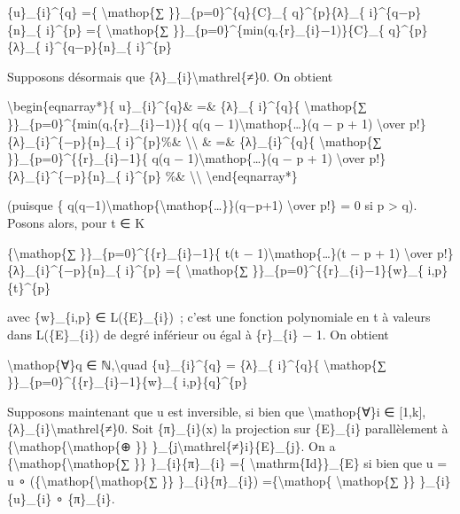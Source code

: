\documentclass[]{article}
\begin{document}
\{u\}\_\{i\}\^{}\{q\} =\{ \textbackslash{}mathop\{∑
\}\}\_\{p=0\}\^{}\{q\}\{C\}\_\{ q\}\^{}\{p\}\{λ\}\_\{
i\}\^{}\{q−p\}\{n\}\_\{ i\}\^{}\{p\} =\{ \textbackslash{}mathop\{∑
\}\}\_\{p=0\}\^{}\{min(q,\{r\}\_\{i\}−1)\}\{C\}\_\{
q\}\^{}\{p\}\{λ\}\_\{ i\}\^{}\{q−p\}\{n\}\_\{ i\}\^{}\{p\}

Supposons désormais que \{λ\}\_\{i\}\textbackslash{}mathrel\{≠\}0. On
obtient

\textbackslash{}begin\{eqnarray*\}\{ u\}\_\{i\}\^{}\{q\}\& =\& \{λ\}\_\{
i\}\^{}\{q\}\{ \textbackslash{}mathop\{∑
\}\}\_\{p=0\}\^{}\{min(q,\{r\}\_\{i\}−1)\}\{ q(q −
1)\textbackslash{}mathop\{\ldots{}\}(q − p + 1) \textbackslash{}over
p!\} \{λ\}\_\{i\}\^{}\{−p\}\{n\}\_\{ i\}\^{}\{p\}\%\&
\textbackslash{}\textbackslash{} \& =\& \{λ\}\_\{i\}\^{}\{q\}\{
\textbackslash{}mathop\{∑ \}\}\_\{p=0\}\^{}\{\{r\}\_\{i\}−1\}\{ q(q −
1)\textbackslash{}mathop\{\ldots{}\}(q − p + 1) \textbackslash{}over
p!\} \{λ\}\_\{i\}\^{}\{−p\}\{n\}\_\{ i\}\^{}\{p\} \%\&
\textbackslash{}\textbackslash{} \textbackslash{}end\{eqnarray*\}

(puisque \{
q(q−1)\textbackslash{}mathop\{\textbackslash{}mathop\{\ldots{}\}\}(q−p+1)
\textbackslash{}over p!\} = 0 si p \textgreater{} q). Posons alors, pour
t ∈ K

\{\textbackslash{}mathop\{∑ \}\}\_\{p=0\}\^{}\{\{r\}\_\{i\}−1\}\{ t(t −
1)\textbackslash{}mathop\{\ldots{}\}(t − p + 1) \textbackslash{}over
p!\} \{λ\}\_\{i\}\^{}\{−p\}\{n\}\_\{ i\}\^{}\{p\} =\{
\textbackslash{}mathop\{∑ \}\}\_\{p=0\}\^{}\{\{r\}\_\{i\}−1\}\{w\}\_\{
i,p\}\{t\}\^{}\{p\}

avec \{w\}\_\{i,p\} ∈ L(\{E\}\_\{i\})~; c'est une fonction polynomiale
en t à valeurs dans L(\{E\}\_\{i\}) de degré inférieur ou égal à
\{r\}\_\{i\} − 1. On obtient

\textbackslash{}mathop\{∀\}q ∈ ℕ,\textbackslash{}quad
\{u\}\_\{i\}\^{}\{q\} = \{λ\}\_\{ i\}\^{}\{q\}\{
\textbackslash{}mathop\{∑ \}\}\_\{p=0\}\^{}\{\{r\}\_\{i\}−1\}\{w\}\_\{
i,p\}\{q\}\^{}\{p\}

Supposons maintenant que u est inversible, si bien que
\textbackslash{}mathop\{∀\}i ∈ {[}1,k{]},
\{λ\}\_\{i\}\textbackslash{}mathrel\{≠\}0. Soit \{π\}\_\{i\}(x) la
projection sur \{E\}\_\{i\} parallèlement à
\{\textbackslash{}mathop\{\textbackslash{}mathop\{⊕ \}\}
\}\_\{j\textbackslash{}mathrel\{≠\}i\}\{E\}\_\{j\}. On a
\{\textbackslash{}mathop\{\textbackslash{}mathop\{∑ \}\}
\}\_\{i\}\{π\}\_\{i\} =\{ \textbackslash{}mathrm\{Id\}\}\_\{E\} si bien
que u = u ∘ (\{\textbackslash{}mathop\{\textbackslash{}mathop\{∑ \}\}
\}\_\{i\}\{π\}\_\{i\}) =\{\textbackslash{}mathop\{
\textbackslash{}mathop\{∑ \}\} \}\_\{i\}\{u\}\_\{i\} ∘ \{π\}\_\{i\}.
\end{document}
